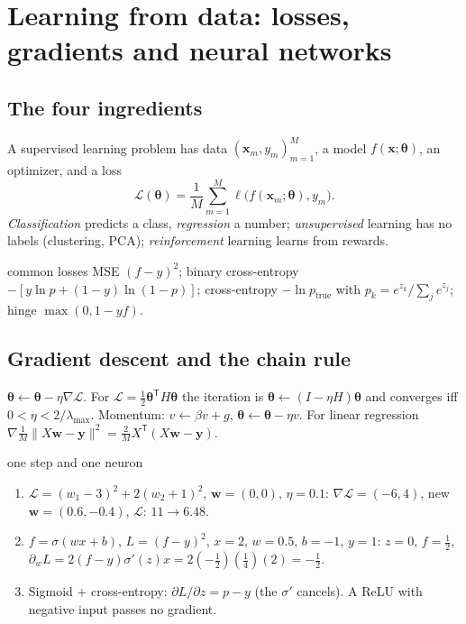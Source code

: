\documentclass[11pt,a4paper,openany]{book}
\newcounter{wex}[chapter]
\newenvironment{steps}{\begin{enumerate}[label=\textbf{Step \arabic*.}, leftmargin=4.2em, itemsep=2pt]}{\end{enumerate}}
\newcommand{\bt}{\boldsymbol\theta}
\newcommand{\bx}{\mathbf x}
\begin{document}
\section{Learning from data: losses, gradients and neural networks}
\subsection{The four ingredients}
A supervised learning problem has data $(\bx_m, y_m)_{m=1}^M$, a model $f(\bx;\bt)$, an optimizer, and a loss
\[ \mathcal L(\bt) = \frac1M\sum_{m=1}^{M}\ell\big(f(\bx_m;\bt), y_m\big). \] \emph{Classification} predicts a class, \emph{regression} a number; \emph{unsupervised} learning has no labels
(clustering, PCA); \emph{reinforcement} learning learns from rewards.

\begin{defn}{common losses}
MSE $(f - y)^2$; binary cross-entropy $-[y\ln p + (1 - y)\ln(1 - p)]$; cross-entropy $-\ln p_{\text{true}}$ with
$p_k = e^{z_k}/\sum_je^{z_j}$; hinge $\max(0, 1 - yf)$.
\end{defn}

\subsection{Gradient descent and the chain rule}
$\bt \leftarrow \bt - \eta\nabla\mathcal L$. For $\mathcal L = \frac12\bt^{\mathsf T}H\bt$ the iteration is $\bt \leftarrow (I - \eta H)\bt$ and converges
iff $0 < \eta < 2/\lambda_{\max}$. Momentum: $v \leftarrow \beta v + g$, $\bt \leftarrow \bt - \eta v$. For linear regression
$\nabla\frac1M\|X\mathbf w - \mathbf y\|^2 = \frac2MX^{\mathsf T}(X\mathbf w - \mathbf y)$.

\begin{wexample}{one step and one neuron}
\begin{steps}
\item $\mathcal L = (w_1 - 3)^2 + 2(w_2 + 1)^2$, $\mathbf w = (0,0)$, $\eta = 0.1$: $\nabla\mathcal L = (-6, 4)$, new $\mathbf w = (0.6, -0.4)$, $\mathcal L$: $11 \to 6.48$.
\item $f = \sigma(wx + b)$, $L = (f - y)^2$, $x = 2$, $w = 0.5$, $b = -1$, $y = 1$: $z = 0$, $f = \frac12$,
$\partial_wL = 2(f - y)\sigma'(z)x = 2(-\frac12)(\frac14)(2) = -\frac12$.
\item Sigmoid + cross-entropy: $\partial L/\partial z = p - y$ (the $\sigma'$ cancels). A ReLU with negative input passes no gradient.
\end{steps}
\end{wexample}
\end{document}
